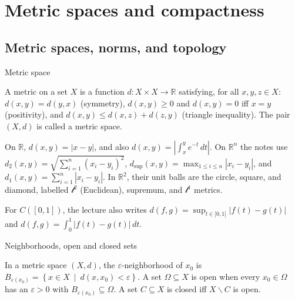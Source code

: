\chapter{Metric spaces and compactness}

\section{Metric spaces, norms, and topology}

\begin{definition}{Metric space}

A metric on a set \(X\) is a function \(d:X \times X\rightarrow\mathbb{R}\) satisfying, for all \(x,y,z \in X\): \(d\left( {x,y} \right) = d\left( {y,x} \right)\) (symmetry), \(d\left( {x,y} \right) \geq 0\) and \(d\left( {x,y} \right) = 0\) iff \(x = y\) (positivity), and \(d\left( {x,y} \right) \leq d\left( {x,z} \right) + d\left( {z,y} \right)\) (triangle inequality). The pair \(\left( {X,d} \right)\) is called a metric space.

\end{definition}

\begin{example}

On \(\mathbb{R}\), \(d\left( {x,y} \right) = \left| {x - y} \right|\), and also \(d\left( {x,y} \right) = \left| {\int_{x}^{y}e^{- t}\, dt} \right|\). On \(\mathbb{R}^{n}\) the notes use \(d_{2}\left( {x,y} \right) = \sqrt{\sum_{i = 1}^{n}\left( {x_{i} - y_{i}} \right)^{2}}\), \(d_{\sup}\left( {x,y} \right) = \max_{1 \leq i \leq n}\left| {x_{i} - y_{i}} \right|\), and \(d_{1}\left( {x,y} \right) = \sum_{i = 1}^{n}\left| {x_{i} - y_{i}} \right|\). In \(\mathbb{R}^{2}\), their unit balls are the circle, square, and diamond, labelled \(\mathcal{l}^{2}\) (Euclidean), supremum, and \(\mathcal{l}^{1}\) metrics.

For \(C\left( \left\lbrack {0,1} \right\rbrack \right)\), the lecture also writes \(d\left( {f,g} \right) = \sup_{t \in {\lbrack{0,1}\rbrack}}\left| {f(t) - g(t)} \right|\) and \(d\left( {f,g} \right) = \int_{0}^{1}\left| {f(t) - g(t)} \right|\, dt\).

\end{example}

\begin{definition}{Neighborhoods, open and closed sets}

In a metric space \(\left( {X,d} \right)\), the \(\varepsilon\)-neighborhood of \(x_{0}\) is \(B_{\varepsilon{(x_{0})}} = \left\{ x \in X\  \middle| \ d\left( {x,x_{0}} \right) < \varepsilon \right\}\). A set \(\Omega \subseteq X\) is open when every \(x_{0} \in \Omega\) has an \(\varepsilon > 0\) with \(B_{\varepsilon{(x_{0})}} \subseteq \Omega\). A set \(C \subseteq X\) is closed iff \(X\backslash C\) is open.

\end{definition}

